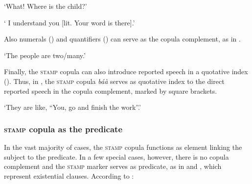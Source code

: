     \trans `What! Where is the child?'
\z


    \trans ` I understand you [lit. Your word is there].'
\z

Also numerals () and quantifiers () can serve as the copula complement, as in .

    \trans `The people are two/many.'
\z



Finally, the \textsc{stamp} copula can also introduce reported speech in a quotative index (). Thus, in , the \textsc{stamp} copula {\itshape báà} serves as quotative index to the direct reported speech in the copula complement, marked by square brackets.


    \trans `They are like, ``You, go and finish the work''.'
\z

\subsubsection*{\textsc{stamp} copula as the predicate} In the vast majority of cases, the \textsc{stamp} copula functions as element linking the subject to the predicate. In a few special cases, however, there is no copula complement and the \textsc{stamp} marker serves as predicate, as in  and , which represent existential clauses. According to \citet[241]{dryer2007a}:


